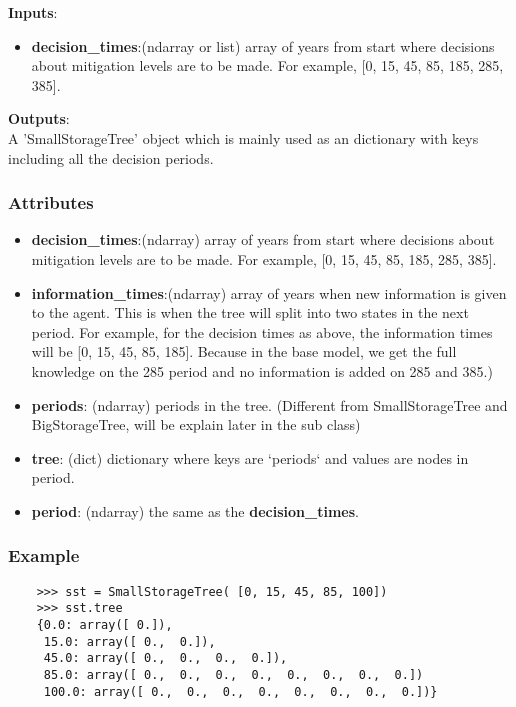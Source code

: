 \documentclass[12pt]{article}
\begin{document}
\textbf{Inputs}:
\begin{itemize}
\item \textbf{decision\_times}:(ndarray or list) array of years from start where decisions about mitigation levels are to be made. For example, [0, 15, 45, 85, 185, 285, 385].
\end{itemize}
\textbf{Outputs}:\\
A 'SmallStorageTree' object which is mainly used as an dictionary with keys including all the decision periods.
\subsubsection{Attributes}
\begin{itemize}
\item \textbf{decision\_times}:(ndarray) array of years from start where decisions about mitigation levels are to be made. For example, [0, 15, 45, 85, 185, 285, 385].
\item \textbf{information\_times}:(ndarray) array of years when new information is given to the agent. This is when the tree will split into two states in the next period. For example, for the decision times as above, the information times will be  [0, 15, 45, 85, 185]. Because in the base model, we get the full knowledge on the 285 period and no information is added on 285 and 385.)
\item \textbf{periods}: (ndarray) 	periods in the tree. (Different from SmallStorageTree and BigStorageTree, will be explain later in the sub class)
\item \textbf{tree}: (dict) dictionary where keys are `periods` and values are nodes in period.
\item \textbf{period}: (ndarray) the same as the \textbf{decision\_times}.
\end{itemize}
\subsubsection{Example}
\begin{verbatim}
    >>> sst = SmallStorageTree( [0, 15, 45, 85, 100])
    >>> sst.tree
    {0.0: array([ 0.]),
     15.0: array([ 0.,  0.]),
     45.0: array([ 0.,  0.,  0.,  0.]),
     85.0: array([ 0.,  0.,  0.,  0.,  0.,  0.,  0.,  0.])
     100.0: array([ 0.,  0.,  0.,  0.,  0.,  0.,  0.,  0.])}
\end{verbatim}
\end{document}
